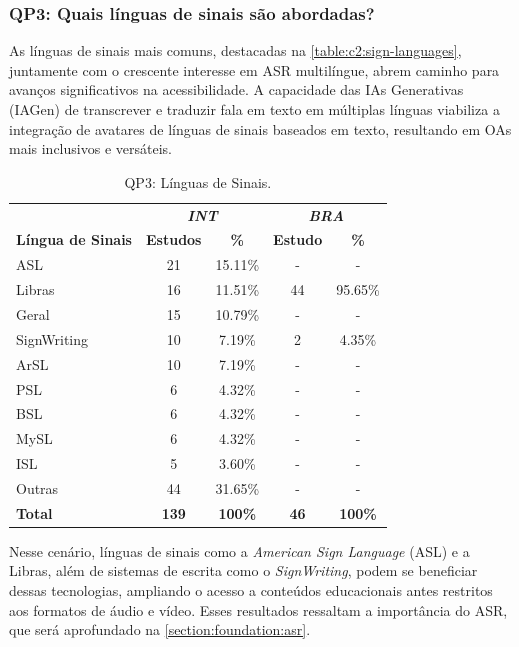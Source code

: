 \subsubsection{QP3: Quais línguas de sinais são abordadas?}


As línguas de sinais mais comuns, destacadas na \autoref{table:c2:sign-languages}, juntamente com o crescente interesse em ASR multilíngue, abrem caminho para avanços significativos na acessibilidade. A capacidade das IAs Generativas (IAGen) de transcrever e traduzir fala em texto em múltiplas línguas viabiliza a integração de avatares de línguas de sinais baseados em texto, resultando em OAs mais inclusivos e versáteis.

\begin{table}[htb]
\caption{QP3: Línguas de Sinais.}
\label{table:c2:sign-languages}
\centering
\begin{tabular}{l|cc|cc} \hline
 & \multicolumn{2}{c|}{\textit{\textbf{INT}}} & \multicolumn{2}{c}{\textit{\textbf{BRA}}} \\ \cline{2-5} 
\textbf{Língua de Sinais} & \textbf{Estudos} & \textbf{\%} & \textbf{Estudo} & \textbf{\%} \\ \hline
ASL & 21 & 15.11\% & - & - \\
Libras & 16 & 11.51\% & 44 & 95.65\% \\
Geral & 15 & 10.79\% & - & - \\
SignWriting & 10 & 7.19\% & 2 & 4.35\% \\
ArSL & 10 & 7.19\% & - & - \\
PSL & 6 & 4.32\% & - & - \\
BSL & 6 & 4.32\% & - & - \\
MySL & 6 & 4.32\% & - & - \\
ISL & 5 & 3.60\% & - & - \\
Outras & 44 & 31.65\% & - & - \\ \hline
\textbf{Total} & \textbf{139} & \textbf{100\%} & \textbf{46} & \textbf{100\%} \\ \hline
\end{tabular}
\end{table}

Nesse cenário, línguas de sinais como a \textit{American Sign Language} (ASL) e a Libras, além de sistemas de escrita como o \textit{SignWriting}, podem se beneficiar dessas tecnologias, ampliando o acesso a conteúdos educacionais antes restritos aos formatos de áudio e vídeo. Esses resultados ressaltam a importância do ASR, que será aprofundado na \autoref{section:foundation:asr}.


